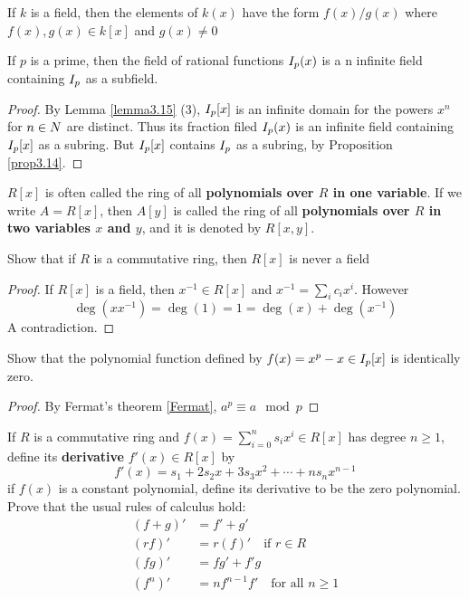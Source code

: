 \documentclass[11pt]{article}
\begin{document}
\begin{proposition}[]
If \(k\) is a field, then the elements of \(k(x)\) have the form \(f(x)/g(x)\)
where \(f(x),g(x)\in k[x]\) and \(g(x)\neq 0\)
\end{proposition}

\begin{proposition}[]
If \(p\) is a prime, then the field of rational functions \(\relax{I}_p(x)\) is a n
infinite field containing \(\relax{I}_p\) as a subfield.
\end{proposition}

\begin{proof}
By Lemma \ref{lemma3.15} (3), \(\relax{I}_p[x]\) is an infinite domain for the powers
\(x^n\) for \(n\in\relax{N}\) are distinct. Thus its fraction filed \(\relax{I}_p(x)\) is an
infinite field containing \(\relax{I}_p[x]\) as a subring. But \(\relax{I}_p[x]\) contains
\(\relax{I}_p\) as a subring, by Proposition \ref{prop3.14}.
\end{proof}


\(R[x]\) is often called the ring of all \textbf{polynomials over \(R\) in one variable}.
If we write \(A=R[x]\), then \(A[y]\) is called the ring of all 
\textbf{polynomials over \(R\) in two variables \(x\) and \(y\)}, and it is denoted by \(R[x,y]\).

\begin{exercise}
Show that if \(R\) is a commutative ring, then \(R[x]\) is never a field
\end{exercise}

\begin{proof}
If \(R[x]\) is a field, then \(x^{-1}\in R[x]\) and \(x^{-1}=\sum_ic_ix^i\).
However
\begin{equation*}
\deg(xx^{-1})=\deg(1)=1=\deg(x)+\deg(x^{-1})
\end{equation*}
A contradiction.
\end{proof}

\begin{exercise}
\label{ex3.22}
Show that the polynomial function defined by \(f(x)=x^p-x\in\relax{I}_p[x]\) is
identically zero.
\end{exercise}

\begin{proof}
By Fermat's theorem \ref{Fermat}, \(a^p\equiv a\mod p\)
\end{proof}

\begin{exercise}
\label{ex3.23}
If \(R\) is a commutative ring and \(f(x)=\sum_{i=0}^n s_ix^i\in R[x]\) has
degree \(n\ge1\), define its \textbf{derivative} \(f'(x)\in R[x]\) by
\begin{equation*}
f'(x)=s_1+2s_2x+3s_3x^2+\cdots+ns_nx^{n-1}
\end{equation*}
if \(f(x)\) is a constant polynomial, define its derivative to be the zero
polynomial. Prove that the usual rules of calculus hold:
\begin{align*}
(f+g)'&=f'+g'\\
(rf)'&=r(f)'\quad\text{if }r\in R\\
(fg)'&=fg'+f'g\\
(f^n)'&=nf^{n-1}f'\quad\text{for all }n\ge 1
\end{align*}
\end{exercise}
\end{document}
